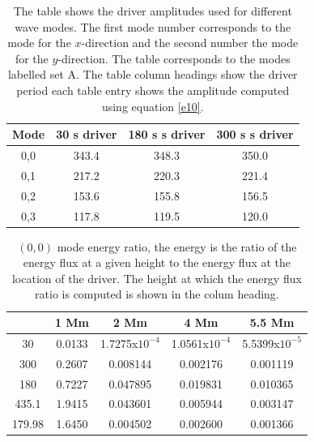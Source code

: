 \documentclass[preprint,authoryear,12pt]{elsarticle}
\begin{document}
\begin{table}\label{simamps}
\centering
\begin{tabular}{c c c c }
\hline
Mode   & 30 s driver & 180 s s driver & 300 s s driver \\
\hline
0,0 & 343.4 & 348.3 & 350.0 \\
\hline
0,1 & 217.2 & 220.3 & 221.4 \\
\hline
0,2 & 153.6 & 155.8 & 156.5 \\
\hline
0,3 & 117.8 & 119.5 & 120.0 \\
\hline
\end{tabular} 
\caption{The table shows the driver amplitudes used for different wave modes. The first mode number corresponds to the mode for the $x$-direction and the second number the mode for the $y$-direction. The table corresponds to the modes labelled set A. The table column headings show the driver period each table entry shows the amplitude computed using equation \ref{e10}.}
\label{Tableamps_30_180_300}
\end{table}






\begin{table}[h]
\centering
\begin{tabular}{c c c c c }
\hline
   &  1 Mm & 2 Mm & 4 Mm & 5.5 Mm \\
\hline
30 &  0.0133 & 1.7275x$10^{-4}$ & 1.0561x$10^{-4}$ & 5.5399x$10^{-5}$ \\
\hline
300 & 0.2607 & 0.008144 & 0.002176 &  0.001119 \\
\hline
180 & 0.7227 & 0.047895 & 0.019831 &  0.010365 \\
\hline
435.1 & 1.9415 & 0.043601 & 0.005944 & 0.003147  \\
\hline
179.98 & 1.6450 & 0.004502 & 0.002600&  0.001366 \\ 
\hline
\hline
\end{tabular} 
\caption{ $(0, 0)$ mode energy ratio, the energy is the ratio of the energy flux at a given height to the energy flux at the location of the driver. The height at which the energy flux ratio is computed is shown in the colum heading.}
\label{Table00mode}
\end{table}
\end{document}
